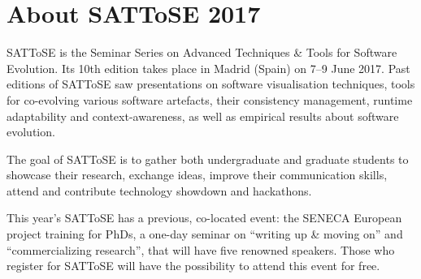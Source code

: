 \documentclass[11pt]{article}
\title{}
\author{}
\date{}
\begin{document}
\maketitle

\clearpage

\section*{About SATToSE 2017}
SATToSE is the Seminar Series on Advanced Techniques \& Tools for Software Evolution. Its 10th edition takes place in Madrid (Spain) on 7–9 June 2017. Past editions of SATToSE saw presentations on software visualisation techniques, tools for co-evolving various software artefacts, their consistency management, runtime adaptability and context-awareness, as well as empirical results about software evolution.

The goal of SATToSE is to gather both undergraduate and graduate students to showcase their research, exchange ideas, improve their communication skills, attend and contribute technology showdown and hackathons.

This year's SATToSE has a previous, co-located event: the SENECA European project training for PhDs, a one-day seminar on ``writing up \& moving on'' and ``commercializing research'', that will have five renowned speakers. Those who register for SATToSE will have the possibility to attend this event for free.
\end{document}
